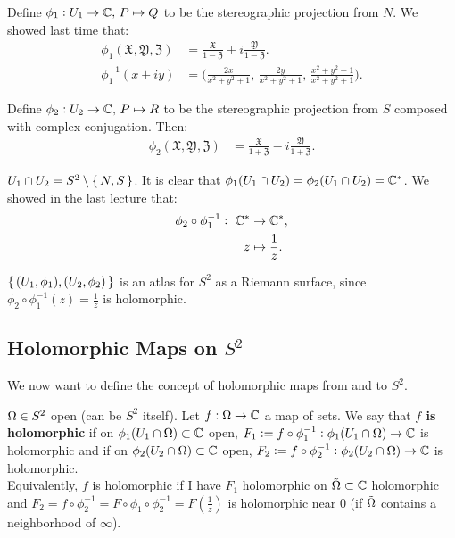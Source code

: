 Define $\phi_1:U_1 \to \mathbb{C}, \, P \mapsto Q$ to be the stereographic projection from $N$. We showed last time that:
\begin{align*}
\phi_1 (\mathfrak{X}, \mathfrak{Y}, \mathfrak{Z}) &= \frac{\mathfrak{X}}{1 - \mathfrak{Z}} + i \frac{ \mathfrak{Y}}{1 - \mathfrak{Z}}.\\
\phi_1^{-1} (x+iy) &= \bigg( \frac{2x}{x^2+y^2+1} , \,  \frac{2y}{x^2+y^2+1} , \, \frac{x^2+y^2-1}{x^2+y^2+1}  \bigg).
\end{align*}


Define $\phi_2:U_2 \to \mathbb{C}, \, P \mapsto \overline{R}$ to be the stereographic projection from $S$ composed with complex conjugation. Then:
\begin{align*}
\phi_2 (\mathfrak{X}, \mathfrak{Y}, \mathfrak{Z}) &= \frac{\mathfrak{X}}{1 + \mathfrak{Z}} - i \frac{ \mathfrak{Y}}{1 + \mathfrak{Z}}.
\end{align*}

$U_1 \cap U_2 = S^2 \setminus \set{N,S}$. It is clear that $\phi_1 (U_1 \cap U_2) = \phi_2(U_1 \cap U_2) = \mathbb{C}^*$. We showed in the last lecture that:
\begin{align*}
    \phi_2 \circ \phi_1^{-1} : \, \, \mathbb{C}^* &\to \mathbb{C}^*,\\
    z &\mapsto \frac{1}{z}.
\end{align*}

\begin{note}
$\set{ (U_1, \phi_1) , (U_2, \phi_2) }$ is an atlas for $S^2$ as a Riemann surface, since $ \phi_2 \circ \phi_1^{-1} (z) = \frac{1}{z}$ is holomorphic.
\end{note}


\subsection{Holomorphic Maps on $S^2$}
We now want to define the concept of holomorphic maps from and to $S^2$.

\begin{definition}

$\Omega \in S^2$ open (can be $S^2$ itself). Let $f:\Omega \rightarrow \mathbb{C}$ a map of sets. We say that \textbf{$f$ is holomorphic} if on $\phi_1 ( U_1 \cap \Omega) \subset \mathbb{C}$ open, $F_1 \vcentcolon= f \circ \phi_1^{-1} : \phi_1(U_1 \cap \Omega) \to \mathbb{C}$ is holomorphic and if on $\phi_2 ( U_2 \cap \Omega) \subset \mathbb{C}$ open, $F_2 \vcentcolon= f \circ \phi_2^{-1} : \phi_2(U_2 \cap \Omega) \to \mathbb{C}$ is holomorphic.\\

Equivalently, $f$ is holomorphic if I have $F_1$ holomorphic on $\Tilde{\Omega} \subset \mathbb{C}$ holomorphic and $F_2 = f \circ \phi_2^{-1} = F \circ \phi_1 \circ \phi_2^{-1} = F \left( \frac{1}{z} \right)$ is holomorphic near $0$ (if $\Tilde{\Omega}$ contains a neighborhood of $\infty$).
\end{definition}


